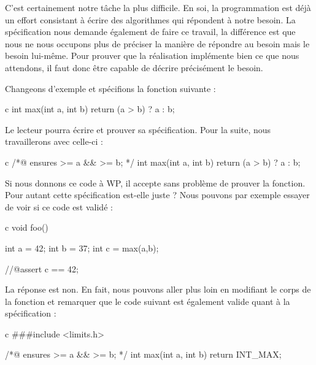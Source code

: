 

C'est certainement notre tâche la plus difficile. En soi, la programmation est
déjà un effort consistant à écrire des algorithmes qui répondent à notre 
besoin. La spécification nous demande également de faire ce travail, la 
différence est que nous ne nous occupons plus de préciser la manière de répondre
au besoin mais le besoin lui-même. Pour prouver que la réalisation implémente 
bien ce que nous attendons, il faut donc être capable de décrire précisément le
besoin.



Changeons d'exemple et spécifions la fonction suivante :



\begin{CodeBlock}{c}
int max(int a, int b){
  return (a > b) ? a : b;
}
\end{CodeBlock}



Le lecteur pourra écrire et prouver sa spécification. Pour la suite, nous 
travaillerons avec celle-ci :



\begin{CodeBlock}{c}
/*@
  ensures \result >= a && \result >= b;
*/
int max(int a, int b){
  return (a > b) ? a : b;
}
\end{CodeBlock}



Si nous donnons ce code à WP, il accepte sans problème de prouver la fonction. 
Pour autant cette spécification est-elle juste ? Nous pouvons par exemple 
essayer de voir si ce code est validé :



\begin{CodeBlock}{c}
void foo(){
  int a = 42;
  int b = 37;
  int c = max(a,b);

  //@assert c == 42;
}
\end{CodeBlock}



La réponse est non. En fait, nous pouvons aller plus loin en modifiant le corps 
de la fonction  et remarquer que le code suivant est également valide 
quant à la spécification :



\begin{CodeBlock}{c}
###include <limits.h>

/*@
  ensures \result >= a && \result >= b;
*/
int max(int a, int b){
  return INT_MAX;
}
\end{CodeBlock}



